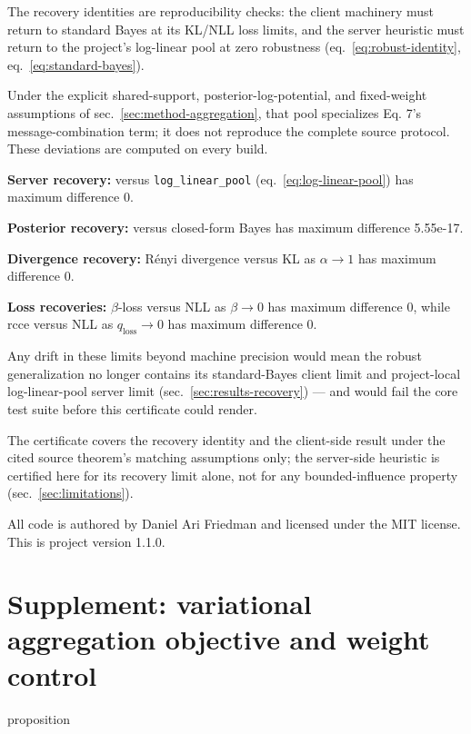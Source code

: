 \documentclass[
  english,
]{article}
\theoremstyle{plain}
\theoremstyle{definition}
\theoremstyle{remark}
\theoremstyle{definition}
\begin{document}
The recovery identities are reproducibility checks: the client machinery
must return to standard Bayes at its KL/NLL loss limits, and the server
heuristic must return to the project's log-linear pool at zero
robustness (eq.~\ref{eq:robust-identity}, eq.~\ref{eq:standard-bayes}).

Under the explicit shared-support, posterior-log-potential, and
fixed-weight assumptions of sec.~\ref{sec:method-aggregation}, that pool
specializes Eq. 7's message-combination term; it does not reproduce the
complete source protocol. These deviations are computed on every build.

\textbf{Server recovery:} 
versus \texttt{log\_linear\_pool} (eq.~\ref{eq:log-linear-pool}) has
maximum difference 0.

\textbf{Posterior recovery:} 
versus closed-form Bayes has maximum difference 5.55e-17.

\textbf{Divergence recovery:} Rényi divergence versus KL as
\(\alpha\to 1\) has maximum difference 0.

\textbf{Loss recoveries:} \(\beta\)-loss versus NLL as \(\beta\to 0\)
has maximum difference 0, while rcce versus NLL as
\(q_{\text{loss}}\to 0\) has maximum difference 0.

Any drift in these limits beyond machine precision would mean the robust
generalization no longer contains its standard-Bayes client limit and
project-local log-linear-pool server limit
(sec.~\ref{sec:results-recovery}) --- and would fail the core test suite
before this certificate could render.

The certificate covers the recovery identity and the client-side result
under the cited source theorem's matching assumptions only; the
server-side  heuristic is certified here for
its recovery limit alone, not for any bounded-influence property
(sec.~\ref{sec:limitations}).

All code is authored by Daniel Ari Friedman and licensed under the MIT
license. This is project version 1.1.0.

\section{Supplement: variational aggregation objective and weight
control}\label{sec:supp-variational}

\ifcsname proposition\endcsname
\else
\newtheorem{proposition}{Proposition}
\fi
\end{document}
